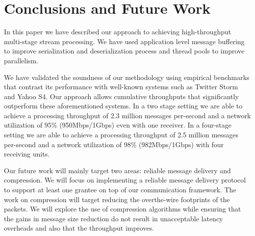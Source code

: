 \section{Conclusions and Future Work}
In this paper we have described our approach to achieving high-throughput multi-stage stream processing.  We have used application level message buffering to improve serialization and deserialization process and thread pools to improve parallelism.

We have validated the soundness of our methodology using empirical benchmarks that contrast its performance with well-known systems such as Twitter Storm \cite{toshniwal2014storm} and Yahoo S4\cite{neumeyer2010s4}. Our approach allows cumulative throughputs that significantly outperform these aforementioned systems. In a two stage setting we are able to achieve a processing throughput of 2.3 million messages per-second and a network utilization of 95\% (950Mbps/1Gbps) even with one receiver. In a four-stage setting we are able to achieve a processing throughput of 2.5 million messages per-second and a network utilization of 98\% (982Mbps/1Gbps) with four receiving units.

Our future work will mainly target two areas: reliable message delivery and compression. We will focus on implementing a reliable message delivery protocol to support at least one grantee on top of our communication framework.  The work on compression will target reducing the overthe-wire footprints of the packets. We will explore the use of compression algorithms while ensuring that the gains in message size reduction do not result in unacceptable latency overheads and also that the throughput improves. 

